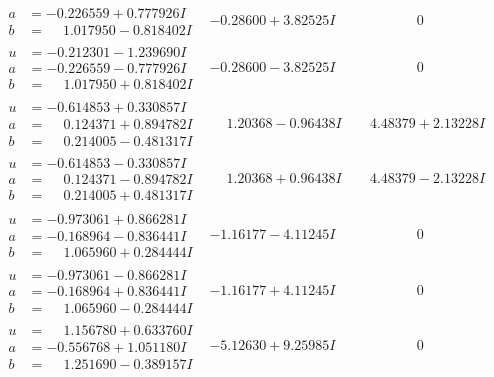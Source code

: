\documentclass[1p]{elsarticle_modified}
\theoremstyle{definition}
\begin{document}
$$\begin{array}{c|c|c}
\begin{aligned}
a &= -0.226559 + 0.777926 I \\
b &= \phantom{-}1.017950 - 0.818402 I\end{aligned}
 & -0.28600 + 3.82525 I & \phantom{-0.000000 } 0 \\ \hline\begin{aligned}
u &= -0.212301 - 1.239690 I \\
a &= -0.226559 - 0.777926 I \\
b &= \phantom{-}1.017950 + 0.818402 I\end{aligned}
 & -0.28600 - 3.82525 I & \phantom{-0.000000 } 0 \\ \hline\begin{aligned}
u &= -0.614853 + 0.330857 I \\
a &= \phantom{-}0.124371 + 0.894782 I \\
b &= \phantom{-}0.214005 - 0.481317 I\end{aligned}
 & \phantom{-}1.20368 - 0.96438 I & \phantom{-}4.48379 + 2.13228 I \\ \hline\begin{aligned}
u &= -0.614853 - 0.330857 I \\
a &= \phantom{-}0.124371 - 0.894782 I \\
b &= \phantom{-}0.214005 + 0.481317 I\end{aligned}
 & \phantom{-}1.20368 + 0.96438 I & \phantom{-}4.48379 - 2.13228 I \\ \hline\begin{aligned}
u &= -0.973061 + 0.866281 I \\
a &= -0.168964 - 0.836441 I \\
b &= \phantom{-}1.065960 + 0.284444 I\end{aligned}
 & -1.16177 - 4.11245 I & \phantom{-0.000000 } 0 \\ \hline\begin{aligned}
u &= -0.973061 - 0.866281 I \\
a &= -0.168964 + 0.836441 I \\
b &= \phantom{-}1.065960 - 0.284444 I\end{aligned}
 & -1.16177 + 4.11245 I & \phantom{-0.000000 } 0 \\ \hline\begin{aligned}
u &= \phantom{-}1.156780 + 0.633760 I \\
a &= -0.556768 + 1.051180 I \\
b &= \phantom{-}1.251690 - 0.389157 I\end{aligned}
 & -5.12630 + 9.25985 I & \phantom{-0.000000 } 0 \\ \hline\begin{aligned}

\end{aligned}
\end{array}$$
\end{document}
